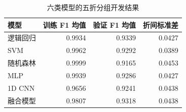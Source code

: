 \begin{table}[htbp]\centering\small
\caption{六类模型的五折分组开发结果}\label{tab:cv}
\begin{tabular}{lrrr}\toprule
模型 & 训练 F1 均值 & 验证 F1 均值 & 折间标准差\\\midrule
逻辑回归 & 0.9934 & 0.9339 & 0.0427\\
SVM & 0.9962 & 0.9292 & 0.0389\\
随机森林 & 0.9999 & 0.9165 & 0.0453\\
MLP & 0.9939 & 0.9286 & 0.0427\\
1D CNN & 0.9656 & 0.9241 & 0.0438\\
融合模型 & 0.9807 & 0.9318 & 0.0438\\
\bottomrule\end{tabular}
\end{table}
